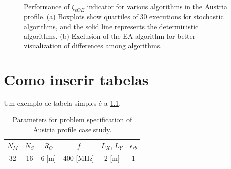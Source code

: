 		
		\begin{figure}
			\centering
			 \\
			\caption[Performance of $\zeta_{\epsilon OE}$ indicator for various algorithms in the Austria profile.]{Performance of $\zeta_{\epsilon OE}$ indicator for various algorithms in the Austria profile. (a) Boxplots show quartiles of 30 executions for stochastic algorithms, and the solid line represents the deterministic algorithms. (b) Exclusion of the EA algorithm for better visualization of differences among algorithms.}
			\label{fig:results:casestudy:austria:boxplot:zeta_eoe}
		\end{figure}
	
	\chapter{Como inserir tabelas}

		\renewcommand{\arraystretch}{1.3}

		Um exemplo de tabela simples é a \ref{tab:results:casestudy:austria:configuration}.
		\begin{table}[!h]
			\centering
			\caption[Parameters for Austria profile case study.]{Parameters for problem specification of Austria profile case study.}
			\begin{tabular}{cccccc}
				$N_M$ & $N_S$ & $R_O$ & $f$ & $L_X$, $L_Y$ & $\epsilon_{rb}$ \\
				32 & 16 & 6 [m] & 400 [MHz] & 2 [m] & 1
			\end{tabular}
			\label{tab:results:casestudy:austria:configuration}
		\end{table}

